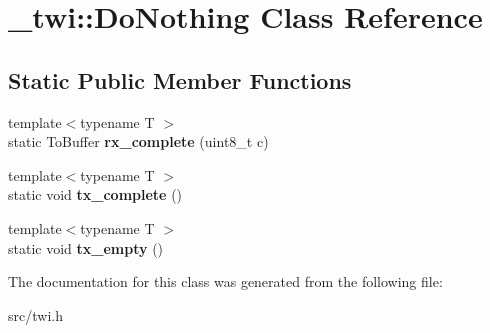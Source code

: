 \hypertarget{class__twi_1_1DoNothing}{}\section{\+\_\+twi\+:\+:Do\+Nothing Class Reference}
\label{class__twi_1_1DoNothing}
\subsection*{Static Public Member Functions}
\begin{DoxyCompactItemize}
\item 
\hypertarget{class__twi_1_1DoNothing_a3c5c8b082aadd118ec8987b55bef1f54}{}\label{class__twi_1_1DoNothing_a3c5c8b082aadd118ec8987b55bef1f54} 
{\footnotesize template$<$typename T $>$ }\\static To\+Buffer {\bfseries rx\+\_\+complete} (uint8\+\_\+t c)
\item 
\hypertarget{class__twi_1_1DoNothing_a72ff5f982285204fbf52b6b1d01365c9}{}\label{class__twi_1_1DoNothing_a72ff5f982285204fbf52b6b1d01365c9} 
{\footnotesize template$<$typename T $>$ }\\static void {\bfseries tx\+\_\+complete} ()
\item 
\hypertarget{class__twi_1_1DoNothing_a6c378eb3e2b2ab309d2125ff40f78882}{}\label{class__twi_1_1DoNothing_a6c378eb3e2b2ab309d2125ff40f78882} 
{\footnotesize template$<$typename T $>$ }\\static void {\bfseries tx\+\_\+empty} ()
\end{DoxyCompactItemize}


The documentation for this class was generated from the following file\+:\begin{DoxyCompactItemize}
\item 
src/twi.\+h\end{DoxyCompactItemize}

